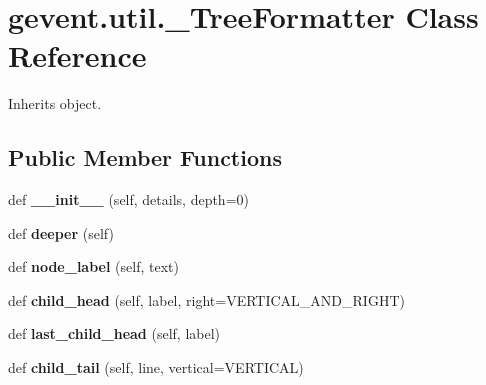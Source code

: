 \hypertarget{classgevent_1_1util_1_1___tree_formatter}{}\section{gevent.\+util.\+\_\+\+Tree\+Formatter Class Reference}
\label{classgevent_1_1util_1_1___tree_formatter}


Inherits object.

\subsection*{Public Member Functions}
\begin{DoxyCompactItemize}
\item 
\mbox{\label{classgevent_1_1util_1_1___tree_formatter_a3a6e46451bdcd9a7037692cf31f822ad}} 
def {\bfseries \+\_\+\+\_\+init\+\_\+\+\_\+} (self, details, depth=0)
\item 
\mbox{\label{classgevent_1_1util_1_1___tree_formatter_a79b13acc1b390084c5cc81cdd2b09565}} 
def {\bfseries deeper} (self)
\item 
\mbox{\label{classgevent_1_1util_1_1___tree_formatter_afa9bb37d156579d970544e98301a7a62}} 
def {\bfseries node\+\_\+label} (self, text)
\item 
\mbox{\label{classgevent_1_1util_1_1___tree_formatter_a5ca37ac0882a08e2841b65ff2e049b1b}} 
def {\bfseries child\+\_\+head} (self, label, right=V\+E\+R\+T\+I\+C\+A\+L\+\_\+\+A\+N\+D\+\_\+\+R\+I\+G\+HT)
\item 
\mbox{\label{classgevent_1_1util_1_1___tree_formatter_aa5a869ea09faf63daef1f4f752943efb}} 
def {\bfseries last\+\_\+child\+\_\+head} (self, label)
\item 
\mbox{\label{classgevent_1_1util_1_1___tree_formatter_aba6f08be76aad95fbdb237f1d785dd31}} 
def {\bfseries child\+\_\+tail} (self, line, vertical=V\+E\+R\+T\+I\+C\+AL)
\item 
\mbox{\label{classgevent_1_1util_1_1___tree_formatter_a991787db20ef7a07f318ee359059d522}} 

\end{DoxyCompactItemize}
